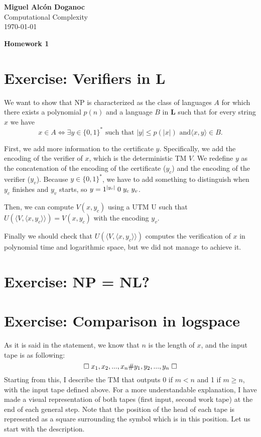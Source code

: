 \documentclass[a4paper, 10pt]{article}
\begin{document}
\noindent
\begin{flushright}
    \large\textbf{Miguel Alcón Doganoc} \\
    Computational Complexity \\
    \today
\end{flushright}

\noindent
{\huge{\textbf{Homework 1}}}

\section{Exercise: Verifiers in L}
We want to show that NP is characterized as the class of languages $A$ for which there exists a polynomial $p(n)$ and a language $B$ in \textbf{L} such that for every string $x$ we have
\[
    x \in A \Leftrightarrow \exists y \in \{0,1\}^* \text{ such that } |y| \leq p(|x|) \text{ and} \langle x,y \rangle \in B.    
\]

First, we add more information to the certificate $y$. Specifically, we add the encoding of the verifier of $x$, which is the deterministic TM $V$. We redefine $y$ as the concatenation of the encoding of the certificate ($y_c$) and the encoding of the verifier ($y_v$). Because $y \in \{0,1\}^*$, we have to add something to distinguish when $y_c$ finishes and $y_v$ starts, so  $y = 1^{|y_c|}\hspace{1mm} 0 \hspace{1mm} y_c \hspace{1mm}  y_v$.

Then, we can compute $V(x,y_c)$ using a UTM U such that $U(\langle V, \langle x,y_c \rangle \rangle) = V(x,y_c)$ with the encoding $y_v$.

Finally we should check that $U(\langle V, \langle x,y_c \rangle \rangle)$ computes the verification of $x$ in polynomial time and logarithmic space, but we did not manage to achieve it.

\section{Exercise: NP = NL?}
\section{Exercise: Comparison in logspace}

As it is said in the statement, we know that $n$ is the length of $x$, and the input tape is as following:
\[
    \square \hspace{1mm} x_1,x_2,...,x_n \# y_1,y_2,...,y_n \hspace{1mm} \square
\]
Starting from this, I describe the TM that outputs 0 if $m < n$ and 1 if $m \geq n$, with the input tape defined above. For a more understandable explanation, I have made a visual representation of both tapes (first input, second work tape) at the end of each general step. Note that the position of the head of each tape is represented as a square surrounding the symbol which is in this position. Let us start with the description.
\end{document}

